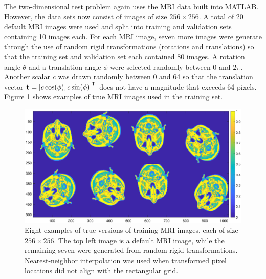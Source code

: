\documentclass[12pt]{article}
\begin{document}
The two-dimensional test problem again uses the MRI data built into MATLAB. However, the data sets now consist of images of size $256 \times 256$. A total of 20 default MRI images were used and split into training and validation sets containing 10 images each. For each MRI image, seven more images were generate through the use of random rigid transformations (rotations and translations) so that the training set and validation set each contained 80 images. A rotation angle $\theta$ and a translation angle $\phi$ were selected randomly between 0 and $2\pi$. Another scalar $c$ was drawn randomly between 0 and 64 so that the translation vector $\mathbf{t} = {[c\cos(\phi),c\sin(\phi)]}^\mathsf{T}$ does not have a magnitude that exceeds 64 pixels. Figure \ref{fig:MRI Transformations} shows examples of true MRI images used in the training set. 

\begin{figure}[ht]
\includegraphics[scale=0.36]{Figures/MRI_Transformations}
\caption{Eight examples of true versions of training MRI images, each of size $256 \times 256$. The top left image is a default MRI image, while the remaining seven were generated from random rigid transformations. Nearest-neighbor interpolation was used when transformed pixel locations did not align with the rectangular grid.}
\label{fig:MRI Transformations}
\end{figure}
\end{document}
